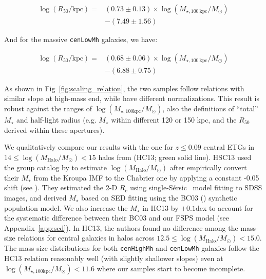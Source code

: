 \documentclass{emulateapj}
\def\ser{{S\'{e}rsic\ }}
\def\rbcg{\texttt{cenHighMh}}
\def\nbcg{\texttt{cenLowMh}}
\def\mstar{{$M_{\star}$}}
\def\logmh{{$\log (M_{\mathrm{Halo}}/M_{\odot})$}}
\def\logmtot{{$\log (M_{\star,100\mathrm{kpc}}/M_{\odot})$}}
\begin{document}
\begin{CJK*}{UTF8}{gbsn}
    \begin{equation}
        \begin{aligned}
        \log (R_{\mathrm{50}}/\mathrm{kpc}) = & (0.73\pm0.13) \times \log (M_{\star, 100\ \mathrm{kpc}}/M_{\odot}) \\ & -(7.49\pm1.56)
        \end{aligned}
    \end{equation}

    \noindent And for the massive \nbcg{} galaxies, we have:
    
    \begin{equation}
        \begin{aligned}
        \log (R_{\mathrm{50}}/\mathrm{kpc}) = & (0.68\pm0.06) \times \log (M_{\star, 100\ \mathrm{kpc}}/M_{\odot}) \\ & -(6.88\pm0.75)
        \end{aligned}
    \end{equation}
    
    \noindent As shown in Fig~\ref{fig:scaling_relation}, the two samples follow 
    relations with similar slope at high-mass end, while have different normalizations.
    This result is robust against the ranges of \logmtot{}, also the definitions of 
    ``total'' \mstar{} and  half-light radius (e.g. \mstar{} within different 120 or 150 
    kpc, and the $R_{\mathrm{50}}$ derived within these apertures).
    
    We qualitatively compare our results with the one for $z\leq 0.09$ central ETGs in  
    $14\le$\logmh{}$<15$ halos from \citealt{HCompany13} (HC13; green solid line).
    HSC13 used the group catalog by \citet{Yang2007} to estimate \logmh{} after
    empirically convert their \mstar{} from the Kroupa IMF to the Chabrier one 
    by applying a constant -0.05 shift (see \citealt{Bernardi2016}).
    They estimated the 2-D $R_{\mathrm{e}}$ using single-\ser{} model fitting to SDSS 
    images, and derived \mstar{} based on SED fitting using the BC03 (\citealt{BC03}) 
    synthetic population model.
    We also increase the \mstar{} in HC13 by $+0.1$dex to account for the systematic 
    difference between their BC03 and our FSPS model (see Appendix~\ref{app:sed}). 
    In HC13, the authors found no difference among the mass-size relations for 
    central galaxies in halos across $12.5\le$\logmh{}$<15.0$. 
    The mass-size distributions for both \rbcg{} and \nbcg{} galaxies follow the 
    HC13 relation reasonably well (with slightly shallower slopes) even at 
    \logmtot{}$< 11.6$ where our samples start to become incomplete. 
    

\end{CJK*}
\end{document}
